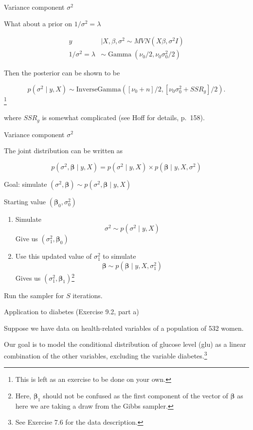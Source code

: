 \documentclass[ignorenonframetext,]{beamer}
\DeclareMathOperator*{\Ga}{Gamma}
\newcommand{\bbeta}{\bm{\beta}}
\begin{document}
\begin{frame}{Variance component \(\sigma^2\)}

What about a prior on \(1/\sigma^2 = \lambda\)

\begin{align}
y &\mid X,\beta, \sigma^2 \sim MVN( X\beta, \sigma^2 I) \\
1/\sigma^2 = \lambda &\sim \Ga(\nu_0/2,\nu_0 \sigma_0^2 /2)
\end{align}

Then the posterior can be shown to be

\[p(\sigma^2 \mid y, X) 
\sim \text{InverseGamma}([\nu_0 + n]/2,[\nu_0 \sigma_0^2 + SSR_g]/2).\]\footnote{This is left as an exercise to be done on your own.}

where \(SSR_g\) is somewhat complicated (see Hoff for details, p.~158).

\end{frame}

\begin{frame}{Variance component \(\sigma^2\)}

The joint distribution can be written as

\[p(\sigma^2, \bbeta \mid y, X) = p(\sigma^2 \mid y, X) \times p(\bbeta \mid y,X, \sigma^2)\]

Goal: simulate \((\sigma^2, \bbeta) \sim p(\sigma^2, \bbeta \mid y, X)\)

Starting value \((\bbeta_0, \sigma^2_0)\)

\begin{enumerate}
\def\labelenumi{\arabic{enumi}.}
\item
  Simulate \[\sigma^2 \sim p(\sigma^2 \mid y, X)\] Give us
  \((\sigma^2_1,\bbeta_0)\)
\item
  Use this updated value of \(\sigma^2_1\) to simulate
  \[\bbeta \sim p(\bbeta \mid y,X, \sigma^2_1)\] Gives us
  \((\sigma^2_1, \bbeta_1)\)\footnote{Here, $\bbeta_1$ should not be confused as the first component of the vector of $\bbeta$ as here we are taking a draw from the Gibbs sampler.}
\end{enumerate}

Run the sampler for \(S\) iterations.

\end{frame}

\begin{frame}{Application to diabetes (Exercise 9.2, part a)}

Suppose we have data on health-related variables of a population of 532
women.

Our goal is to model the conditional distribution of glucose level (glu)
as a linear combination of the other variables, excluding the variable
diabetes.\footnote{See Exercise 7.6 for the data description.}

\end{frame}
\end{document}
